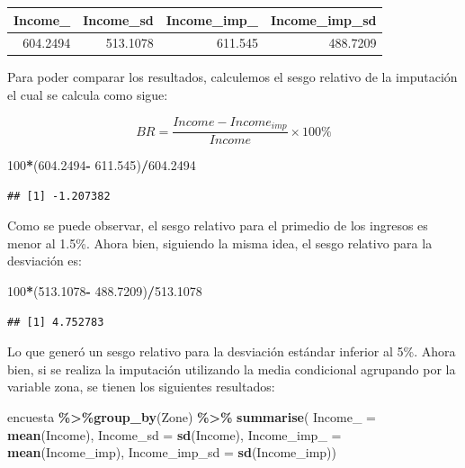 \documentclass[
  12pt,
]{book}
\newenvironment{Shaded}{\begin{snugshade}}{\end{snugshade}}
\newcommand{\AttributeTok}[1]{\textcolor[rgb]{0.13,0.29,0.53}{#1}}
\newcommand{\DecValTok}[1]{\textcolor[rgb]{0.00,0.00,0.81}{#1}}
\newcommand{\FloatTok}[1]{\textcolor[rgb]{0.00,0.00,0.81}{#1}}
\newcommand{\FunctionTok}[1]{\textcolor[rgb]{0.13,0.29,0.53}{\textbf{#1}}}
\newcommand{\NormalTok}[1]{#1}
\newcommand{\SpecialCharTok}[1]{\textcolor[rgb]{0.81,0.36,0.00}{\textbf{#1}}}
\begin{document}
\begin{tabular}{r|r|r|r}
\hline
Income\_ & Income\_sd & Income\_imp\_ & Income\_imp\_sd\\
\hline
604.2494 & 513.1078 & 611.545 & 488.7209\\
\hline
\end{tabular}

Para poder comparar los resultados, calculemos el sesgo relativo de la imputación el cual se calcula como sigue:

\[
BR=\frac{Income-Income_{imp}}{Income}\times100\%
\]

\begin{Shaded}
\begin{Highlighting}[]
\DecValTok{100}\SpecialCharTok{*}\NormalTok{(}\FloatTok{604.2494}\SpecialCharTok{{-}} \FloatTok{611.545}\NormalTok{)}\SpecialCharTok{/}\FloatTok{604.2494}
\end{Highlighting}
\end{Shaded}

\begin{verbatim}
## [1] -1.207382
\end{verbatim}

Como se puede observar, el sesgo relativo para el primedio de los ingresos es menor al 1.5\%. Ahora bien, siguiendo la misma idea, el sesgo relativo para la desviación es:

\begin{Shaded}
\begin{Highlighting}[]
\DecValTok{100}\SpecialCharTok{*}\NormalTok{(}\FloatTok{513.1078}\SpecialCharTok{{-}} \FloatTok{488.7209}\NormalTok{)}\SpecialCharTok{/}\FloatTok{513.1078}
\end{Highlighting}
\end{Shaded}

\begin{verbatim}
## [1] 4.752783
\end{verbatim}

Lo que generó un sesgo relativo para la desviación estándar inferior al 5\%. Ahora bien, si se realiza la imputación utilizando la media condicional agrupando por la variable zona, se tienen los siguientes resultados:

\begin{Shaded}
\begin{Highlighting}[]
\NormalTok{encuesta }\SpecialCharTok{\%\textgreater{}\%}\FunctionTok{group\_by}\NormalTok{(Zone) }\SpecialCharTok{\%\textgreater{}\%}  \FunctionTok{summarise}\NormalTok{(}
  \AttributeTok{Income\_ =} \FunctionTok{mean}\NormalTok{(Income),}
  \AttributeTok{Income\_sd =} \FunctionTok{sd}\NormalTok{(Income),}
  \AttributeTok{Income\_imp\_ =} \FunctionTok{mean}\NormalTok{(Income\_imp),}
  \AttributeTok{Income\_imp\_sd =} \FunctionTok{sd}\NormalTok{(Income\_imp))}
\end{Highlighting}
\end{Shaded}
\end{document}
